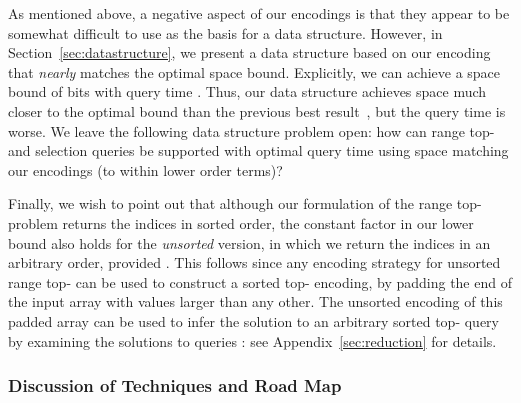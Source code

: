 \documentclass[runningheads]{llncs}
\begin{document}
As mentioned above, a negative aspect of our encodings is that they
appear to be somewhat difficult to use as the basis for a data
structure.  However, in Section~\ref{sec:datastructure}, we present a
data structure based on our encoding that \emph{nearly} matches the
optimal space bound.  Explicitly, we can achieve a space bound of
 bits with query time
.  Thus, our data structure achieves space
much closer to the optimal bound than the previous best
result~\cite{NRS14}, but the query time is worse.  We leave the
following data structure problem open: how can range top- and
selection queries be supported with optimal query time using space
matching our encodings (to within lower order terms)?

Finally, we wish to point out that although our formulation of the
range top- problem returns the indices in sorted order, the
constant factor in our lower bound also holds for the \emph{unsorted}
version, in which we return the indices in an arbitrary order,
provided .  This follows since any encoding strategy for
unsorted range top- can be used to construct a sorted top-
encoding, by padding the end of the input array with  values
larger than any other.  The unsorted encoding of this padded array can
be used to infer the solution to an arbitrary sorted top- query
 by examining the solutions to queries : see Appendix~\ref{sec:reduction} for details.





\subsubsection{Discussion of Techniques and Road Map} 
\end{document}
